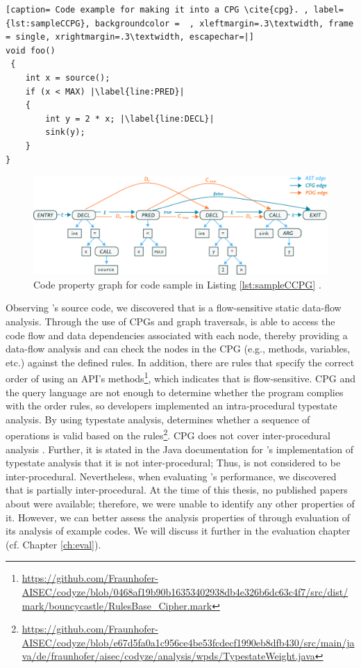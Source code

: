 \begin{lstlisting}[caption= Code example for making it into a CPG \cite{cpg}. , label={lst:sampleCCPG}, backgroundcolor =  , xleftmargin=.3\textwidth, frame = single, xrightmargin=.3\textwidth, escapechar=|]
void foo() 
 {  
    int x = source(); 
    if (x < MAX) |\label{line:PRED}|
    { 
        int y = 2 * x; |\label{line:DECL}|
        sink(y); 
    } 
}

\end{lstlisting}
\begin{figure}[H]
\centering
\includegraphics[width=1\linewidth]{figures/cpg-original.png}
\caption{Code property graph for code sample in Listing \ref{lst:sampleCCPG} \cite{cpg}.}
\label{fig:CPG}
\end{figure}

Observing \codyze's source code, we discovered that \codyze{} is a flow-sensitive static data-flow analysis. Through the use of CPGs and graph traversals, \codyze{} is able to access the code flow and data dependencies associated with each node, thereby providing a data-flow analysis and can check the nodes in the CPG (e.g., methods, variables, etc.) against the defined \MARK{} rules. In addition, there are \MARK{} rules that specify the correct order of using an API's methods\footnote{\url{https://github.com/Fraunhofer-AISEC/codyze/blob/0468af19b90b16353402938db4e326b6dc63c4f7/src/dist/mark/bouncycastle/RulesBase_Cipher.mark}}, which indicates that \codyze{} is flow-sensitive. CPG and the query language are not enough to determine whether the program complies with the \MARK{} order rules, so \codyze{} developers implemented an intra-procedural typestate analysis. By using typestate analysis, \codyze{} determines whether a sequence of operations is valid based on the \MARK{} rules\footnote{\url{https://github.com/Fraunhofer-AISEC/codyze/blob/e67d5fa0a1c956ce4be53fcdecf1990eb8dfb430/src/main/java/de/fraunhofer/aisec/codyze/analysis/wpds/TypestateWeight.java}}.
CPG does not cover inter-procedural analysis \cite{cpg}. Further, it is stated in the Java documentation for \codyze's implementation of typestate analysis that it is not inter-procedural; Thus, \codyze{} is not considered to be inter-procedural. Nevertheless, when evaluating \codyze's performance, we discovered that \codyze{} is partially inter-procedural. At the time of this thesis, no published papers about \codyze{} were available; therefore, we were unable to identify any other properties of it. However, we can better assess the analysis properties of \codyze{} through evaluation of its analysis of example codes. We will discuss it further in the evaluation chapter (cf. Chapter \ref{ch:eval}).



